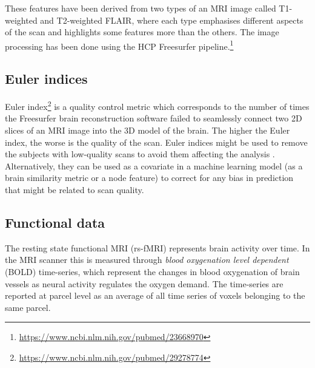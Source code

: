 These features have been derived from two types of an MRI image called T1-weighted and T2-weighted FLAIR, where each type emphasises different aspects of the scan and highlights some features more than the others. The image processing has been done using the HCP Freesurfer pipeline.\footnote{\url{https://www.ncbi.nlm.nih.gov/pubmed/23668970}} 


\subsection{Euler indices}
Euler index\footnote{\url{https://www.ncbi.nlm.nih.gov/pubmed/29278774}} is a quality control metric which corresponds to the number of times the Freesurfer brain reconstruction software failed to seamlessly connect two 2D slices of an MRI image into the 3D model of the brain. The higher the Euler index, the worse is the quality of the scan. Euler indices might be used to remove the subjects with low-quality scans to avoid them affecting the analysis \cite{kaufmann2019}. Alternatively, they can be used as a covariate in a machine learning model (as a brain similarity metric or a node feature) to correct for any bias in prediction that might be related to scan quality.

\subsection{Functional data}
The resting state functional MRI (rs-fMRI) represents brain activity over time. In the MRI scanner this is measured through \textit{blood oxygenation level dependent} (BOLD) time-series, which represent the changes in blood oxygenation of brain vessels as neural activity regulates the oxygen demand. The time-series are reported at parcel level as an average of all time series of voxels belonging to the same parcel.


